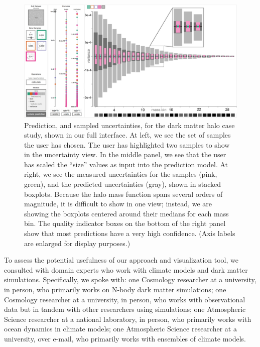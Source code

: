 
\label{hmf_case_study}
\begin{figure}[h]
      \includegraphics[width=\textwidth]{images/sampling/hmf_prediction_case_study.png}
     \caption{Prediction, and sampled uncertainties, for the dark matter halo case study, shown in our full interface. At left, we see the set of samples the user has chosen. The user has highlighted two samples to show in the uncertainty view. In the middle panel, we see that the user has scaled the ``size'' values as input into the prediction model. At right, we see the measured uncertainties for the samples (pink, green), and the predicted uncertainties (gray), shown in stacked boxplots. Because the halo mass function spans several orders of magnitude, it is difficult to show in one view; instead, we are showing the boxplots centered around their medians for each mass bin. The quality indicator boxes on the bottom of the right panel show that most predictions have a very high confidence. (Axis labels are enlarged for display purposes.)}
     \label{hmf_predicted}
\end{figure}

To assess the potential usefulness of our approach and visualization tool, we consulted with domain experts who work with climate models and dark matter simulations. Specifically, we spoke with: one Cosmology researcher at a university, in person, who primarily works on N-body dark matter simulations; one Cosmology researcher at a university, in person, who works with observational data but in tandem with other researchers using simulations; one Atmospheric Science researcher at a national laboratory, in person, who primarily works with ocean dynamics in climate models; one Atmospheric Science researcher at a university, over e-mail, who primarily works with ensembles of climate models.

